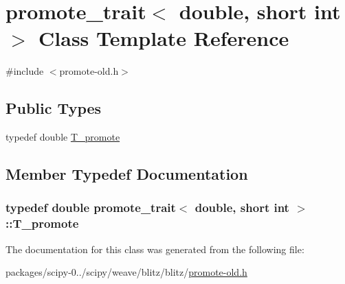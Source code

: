 \hypertarget{classpromote__trait_3_01double_00_01short_01int_01_4}{}\section{promote\+\_\+trait$<$ double, short int $>$ Class Template Reference}
\label{classpromote__trait_3_01double_00_01short_01int_01_4}


{\ttfamily \#include $<$promote-\/old.\+h$>$}

\subsection*{Public Types}
\begin{DoxyCompactItemize}
\item 
typedef double \hyperlink{classpromote__trait_3_01double_00_01short_01int_01_4_a422bcfa240382adaf07a69d769d54004}{T\+\_\+promote}
\end{DoxyCompactItemize}


\subsection{Member Typedef Documentation}
\hypertarget{classpromote__trait_3_01double_00_01short_01int_01_4_a422bcfa240382adaf07a69d769d54004}{}
\subsubsection[{T\+\_\+promote}]{\setlength{\rightskip}{0pt plus 5cm}typedef double {\bf promote\+\_\+trait}$<$ double, short int $>$\+::{\bf T\+\_\+promote}}\label{classpromote__trait_3_01double_00_01short_01int_01_4_a422bcfa240382adaf07a69d769d54004}


The documentation for this class was generated from the following file\+:\begin{DoxyCompactItemize}
\item 
packages/scipy-\/0../scipy/weave/blitz/blitz/\hyperlink{promote-old_8h}{promote-\/old.\+h}\end{DoxyCompactItemize}
